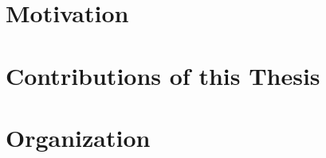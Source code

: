 \section{Motivation}
\label{motivation}


\section{Contributions of this Thesis}
\label{contributions}


\section{Organization}
\label{organization}


\begin{comment}
\section{Schedule}
\label{schedule}

\end{comment}
